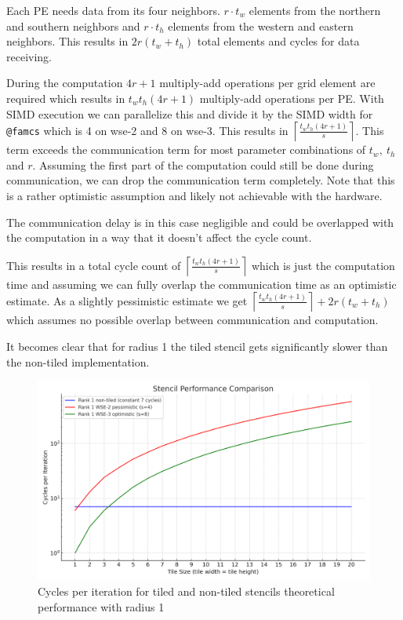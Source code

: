 \documentclass{article}
\begin{document}
Each PE needs data from its four neighbors. $r\cdot t_w$ elements from the northern and southern neighbors and $r\cdot t_h$ elements from the western and eastern neighbors. This results in $2r(t_w+t_h)$ total elements and cycles for data receiving.

During the computation $4r+1$ multiply-add operations per grid element are required which results in $t_wt_h(4r+1)$ multiply-add operations per PE. With SIMD execution we can parallelize this and divide it by the SIMD width for \texttt{@famcs} which is 4 on wse-2 and 8 on wse-3. This results in $\left\lceil\frac{t_wt_h(4r+1)}{s}\right\rceil$. This term exceeds the communication term for most parameter combinations of $t_w,\ t_h$ and $r$. Assuming the first part of the computation could still be done during communication, we can drop the communication term completely. Note that this is a rather optimistic assumption and likely not achievable with the hardware.

The communication delay is in this case negligible and could be overlapped with the computation in a way that it doesn't affect the cycle count. 

This results in a total cycle count of $\left\lceil\frac{t_wt_h(4r+1)}{s}\right\rceil$ which is just the computation time and assuming we can fully overlap the communication time as an optimistic estimate. As a slightly pessimistic estimate we get $\left\lceil\frac{t_wt_h(4r+1)}{s}\right\rceil+2r(t_w+t_h)$ which assumes no possible overlap between communication and computation. 

It becomes clear that for radius 1 the tiled stencil gets significantly slower than the non-tiled implementation. 
\begin{figure}
    \centering
    \includegraphics[width=0.5\linewidth]{plots/stencil_performance_comparison.png}
    \caption{Cycles per iteration for tiled and non-tiled stencils theoretical performance with radius 1 }
    \label{fig:enter-label}
\end{figure}
\end{document}

